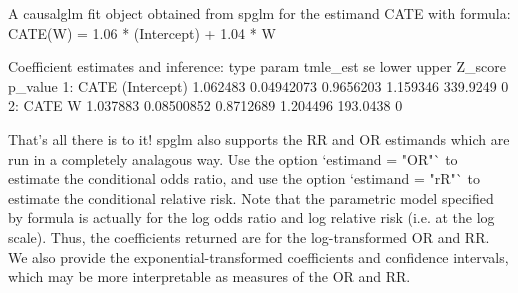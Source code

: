 \documentclass[article]{jss}
\begin{document}
\begin{Schunk}
\begin{Soutput}
A causalglm fit object obtained from spglm for the estimand CATE with formula: 
CATE(W) = 1.06 * (Intercept) + 1.04 * W

Coefficient estimates and inference:
   type       param tmle_est         se     lower    upper  Z_score p_value
1: CATE (Intercept) 1.062483 0.04942073 0.9656203 1.159346 339.9249       0
2: CATE           W 1.037883 0.08500852 0.8712689 1.204496 193.0438       0
\end{Soutput}
\end{Schunk}



That's all there is to it! spglm also supports the RR and OR estimands which are run in a completely analagous way. Use the option `estimand = "OR"` to estimate the conditional odds ratio, and use the option `estimand = "rR"` to estimate the conditional relative risk. Note that the parametric model specified by formula is actually for the log odds ratio and log relative risk (i.e. at the log scale). Thus, the coefficients returned are for the log-transformed OR and RR. We also provide the exponential-transformed coefficients and confidence intervals, which may be more interpretable as measures of the OR and RR.
\end{document}
